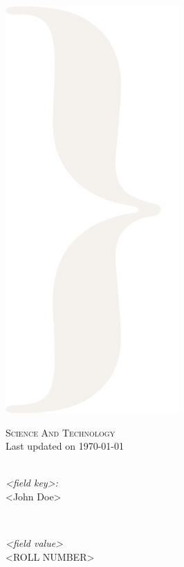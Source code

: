 \begin{titlepage}
    \includegraphics[scale=.15]{images/right.png}
    \vspace{1cm}
    \newcommand{\HRule}{\rule{\linewidth}{0.5mm}}
    \center

    \textsc{\LARGE Science And Technology}\\ [1.0cm]
    {\large Last updated on \today} \\
    \textsc{}\\[0.4cm]
    \begin{center}
    \end{center}
    \begin{minipage}{0.45\textwidth}
        \begin{flushleft} \large
            \emph{<field key>:}\\
            <John Doe>
        \end{flushleft}
    \end{minipage}
    ~
    \begin{minipage}{0.45\textwidth}
        \begin{flushright} \large
            \emph{<field value>} \\
            <ROLL NUMBER>
        \end{flushright}
    \end{minipage}\\[1cm]
    \begin{center}


\end{center}
\end{titlepage}
